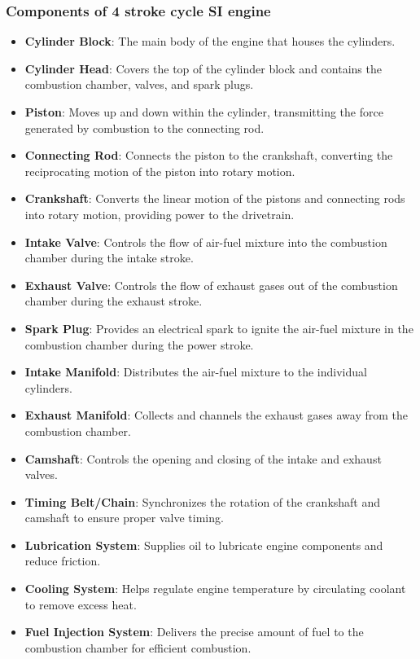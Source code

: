 \documentclass{article}
\begin{document}
\subsubsection*{Components of 4 stroke cycle SI engine}
\begin{itemize}
\item \textbf{Cylinder Block}: The main body of the engine that houses the cylinders.

\item \textbf{Cylinder Head}: Covers the top of the cylinder block and contains the combustion chamber, valves, and spark plugs.

\item \textbf{Piston}: Moves up and down within the cylinder, transmitting the force generated by combustion to the connecting rod.

\item \textbf{Connecting Rod}: Connects the piston to the crankshaft, converting the reciprocating motion of the piston into rotary motion.

\item \textbf{Crankshaft}: Converts the linear motion of the pistons and connecting rods into rotary motion, providing power to the drivetrain.

\item \textbf{Intake Valve}: Controls the flow of air-fuel mixture into the combustion chamber during the intake stroke.

\item \textbf{Exhaust Valve}: Controls the flow of exhaust gases out of the combustion chamber during the exhaust stroke.

\item \textbf{Spark Plug}: Provides an electrical spark to ignite the air-fuel mixture in the combustion chamber during the power stroke.

\item \textbf{Intake Manifold}: Distributes the air-fuel mixture to the individual cylinders.

\item \textbf{Exhaust Manifold}: Collects and channels the exhaust gases away from the combustion chamber.

\item \textbf{Camshaft}: Controls the opening and closing of the intake and exhaust valves.

\item \textbf{Timing Belt/Chain}: Synchronizes the rotation of the crankshaft and camshaft to ensure proper valve timing.

\item \textbf{Lubrication System}: Supplies oil to lubricate engine components and reduce friction.

\item \textbf{Cooling System}: Helps regulate engine temperature by circulating coolant to remove excess heat.

\item \textbf{Fuel Injection System}: Delivers the precise amount of fuel to the combustion chamber for efficient combustion.
\end{itemize}
\end{document}
